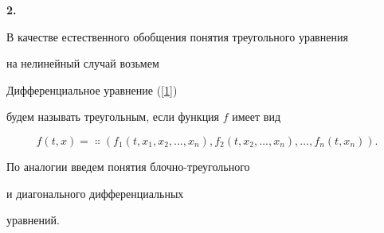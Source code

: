 {\bf 2.}


В качестве естественного обобщения понятия треугольного уравнения


на нелинейный случай возьмем





\begin{defn}


Дифференциальное уравнение (\ref{1})


будем называть треугольным, если функция $f$ имеет вид


$$


f(t,x)=\Colon(f_{1}(t,x_{1},x_{2},\dotsc,x_{n}),


f_{2}(t,x_{2},\dotsc,x_{n}),\dotsc,f_{n}(t,x_{n})).


$$


\end{defn}





По аналогии введем понятия блочно-треугольного


и диагонального дифференциальных 


уравнений.





